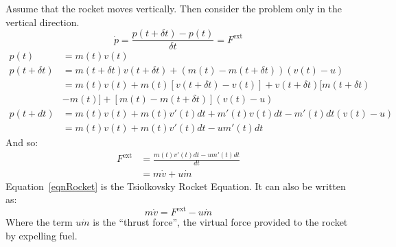 \documentclass[../Main.tex]{subfiles}
\begin{document}
Assume that the rocket moves vertically. Then consider the problem only in the vertical direction.
\begin{equation*}
    \dot{p} = \frac{p(t + \delta t) - p(t)}{\delta t} = F^\text{ext}
\end{equation*}
\begin{align*}
    p(t) &= m(t) v(t) \\
    p(t + \delta t) &= m(t + \delta t) v(t + \delta t) + (m(t) - m(t + \delta t))(v(t) - u) \\
    &= m(t)v(t) + m(t)[v(t + \delta t) - v(t)] + v(t+ \delta t)[m(t + \delta t)\\
    &- m(t)] + [m(t) - m(t + \delta t)](v(t) - u) \\
    p(t + dt) &= m(t) v(t) + m(t) v'(t)dt + m'(t) v(t) dt - m'(t) dt (v(t) - u) \\
    &= m(t) v(t) + m(t) v'(t) dt - u m'(t) dt
\end{align*}
And so:
\begin{align}
    F^\text{ext} &= \frac{m(t) v'(t) dt - u m'(t) dt}{dt} \nonumber\\
    &= m\dot{v} + u\dot{m} \label{eqnRocket}
\end{align}
Equation~\ref{eqnRocket} is the Tsiolkovsky Rocket Equation. It can also be written as:
\begin{equation}
    m\dot{v} = F^\text{ext} - u\dot{m}
    \label{eqnRocketThrust}
\end{equation}
Where the term $u \dot{m}$ is the ``thrust force'', the virtual force provided to the rocket by expelling fuel.
\end{document}
